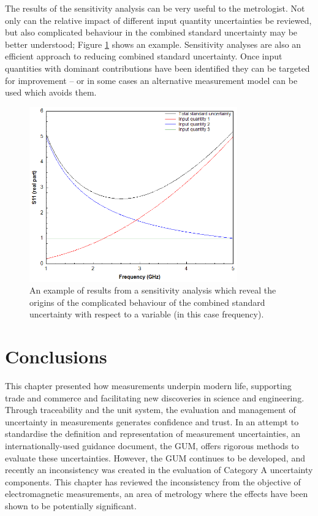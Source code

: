 \documentclass[../thesis/thesis.tex]{subfiles}
\begin{document}
\begin{refsection}
The results of the sensitivity analysis can be very useful to the metrologist. Not only can the relative impact of different input quantity uncertainties be reviewed, but also complicated behaviour in the combined standard uncertainty may be better understood; Figure \ref{ch3_fig_sensitivity} shows an example. Sensitivity analyses are also an efficient approach to reducing combined standard uncertainty. Once input quantities with dominant contributions have been identified they can be targeted for improvement – or in some cases an alternative measurement model can be used which avoids them.

\begin{figure}[h!]
	\centering
	\includegraphics[width=0.8\textwidth]{sensitivity}
	\caption[Sensitivity analysis example results.]{An example of results from a sensitivity analysis which reveal the origins of the complicated behaviour of the combined standard uncertainty with respect to a variable (in this case frequency).}
	\label{ch3_fig_sensitivity}
\end{figure}

\section{Conclusions}

This chapter presented how measurements underpin modern life, supporting trade and commerce and facilitating new discoveries in science and engineering. Through traceability and the unit system, the evaluation and management of uncertainty in measurements generates confidence and trust. In an attempt to standardise the definition and representation of measurement uncertainties, an internationally-used guidance document, the GUM, offers rigorous methods to evaluate these uncertainties. However, the GUM continues to be developed, and recently an inconsistency was created in the evaluation of Category A uncertainty components. This chapter has reviewed the inconsistency from the objective of electromagnetic measurements, an area of metrology where the effects have been shown to be potentially significant.


\end{refsection}
\end{document}
